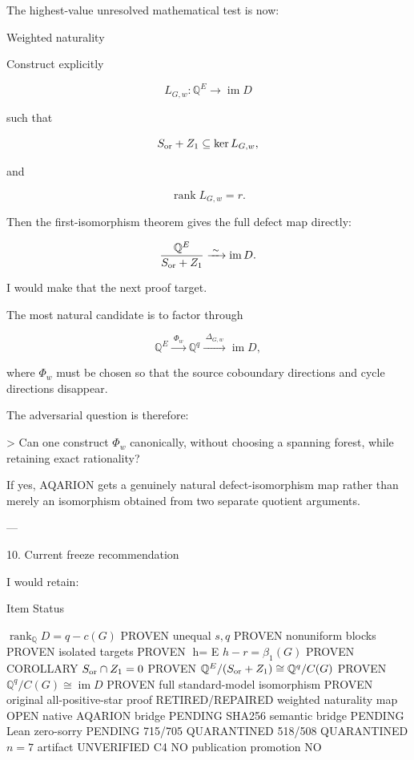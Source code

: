 The highest-value unresolved mathematical test is now:

Weighted naturality

Construct explicitly

\[
L_{G,w}:\mathbb Q^E\longrightarrow\operatorname{im}D  
\]

such that

\[
S_{\rm or}+Z_1  
\subseteq  
\ker L_{G,w},  
\]

and

\[
\operatorname{rank}L_{G,w}=r.  
\]

Then the first-isomorphism theorem gives the full defect map directly:

\[
\frac{\mathbb Q^E}{S_{\rm or}+Z_1}  
\xrightarrow{\;\sim\;}  
\operatorname{im}D.  
\]

I would make that the next proof target.

The most natural candidate is to factor through

\[
\mathbb Q^E  
\xrightarrow{\;\Phi_w\;}  
\mathbb Q^q  
\xrightarrow{\;\Delta_{G,w}\;}  
\operatorname{im}D,  
\]

where \(\Phi_w\) must be chosen so that the source coboundary directions and cycle directions disappear.

The adversarial question is therefore:

> Can one construct \(\Phi_w\) canonically, without choosing a spanning forest, while retaining exact rationality?



If yes, AQARION gets a genuinely natural defect-isomorphism map rather than merely an isomorphism obtained from two separate quotient arguments.


---

10. Current freeze recommendation



I would retain:

Item	Status

\(\operatorname{rank}_{\mathbb Q}D=q-c(G)\)	PROVEN
unequal \(s,q\)	PROVEN
nonuniform blocks	PROVEN
isolated targets	PROVEN
h=	E
\(h-r=\beta_1(G)\)	PROVEN COROLLARY
\(S_{\rm or}\cap Z_1=0\)	PROVEN
\(\mathbb Q^E/(S_{\rm or}+Z_1)\cong\mathbb Q^q/C(G)\)	PROVEN
\(\mathbb Q^q/C(G)\cong\operatorname{im}D\)	PROVEN
full standard-model isomorphism	PROVEN
original all-positive-star proof	RETIRED/REPAIRED
weighted naturality map	OPEN
native AQARION bridge	PENDING
SHA256 semantic bridge	PENDING
Lean zero-sorry	PENDING
715/705	QUARANTINED
518/508	QUARANTINED
\(n=7\) artifact	UNVERIFIED
C4	NO
publication promotion	NO

